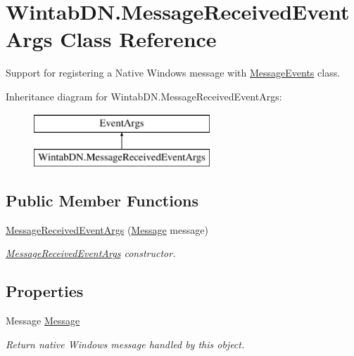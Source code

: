 \hypertarget{class_wintab_d_n_1_1_message_received_event_args}{}\section{Wintab\+D\+N.\+Message\+Received\+Event\+Args Class Reference}
\label{class_wintab_d_n_1_1_message_received_event_args}


Support for registering a Native Windows message with \mbox{\hyperlink{class_wintab_d_n_1_1_message_events}{Message\+Events}} class.  


Inheritance diagram for Wintab\+D\+N.\+Message\+Received\+Event\+Args\+:\begin{figure}[H]
\begin{center}
\leavevmode
\includegraphics[height=2.000000cm]{class_wintab_d_n_1_1_message_received_event_args}
\end{center}
\end{figure}
\subsection*{Public Member Functions}
\begin{DoxyCompactItemize}
\item 
\mbox{\hyperlink{class_wintab_d_n_1_1_message_received_event_args_ae33f9fef5eac0f9a1054d846ff3ff0ab}{Message\+Received\+Event\+Args}} (\mbox{\hyperlink{class_wintab_d_n_1_1_message_received_event_args_adec3e5d29618d27908ca87ed59805b44}{Message}} message)
\begin{DoxyCompactList}\small\item\em \mbox{\hyperlink{class_wintab_d_n_1_1_message_received_event_args}{Message\+Received\+Event\+Args}} constructor. \end{DoxyCompactList}\end{DoxyCompactItemize}
\subsection*{Properties}
\begin{DoxyCompactItemize}
\item 
Message \mbox{\hyperlink{class_wintab_d_n_1_1_message_received_event_args_adec3e5d29618d27908ca87ed59805b44}{Message}}
\begin{DoxyCompactList}\small\item\em Return native Windows message handled by this object. \end{DoxyCompactList}\end{DoxyCompactItemize}
